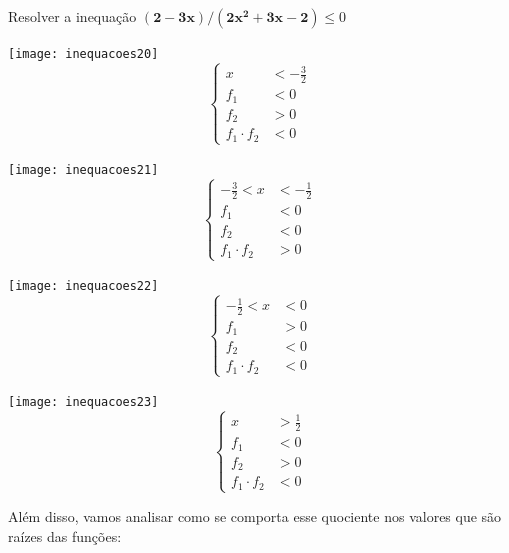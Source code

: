 \begin{example}{Resolver a inequação $\bm{(2-3x)/(2x^2+3x-2)}\leq0$}
\begin{minipage}{.195\linewidth}
\centering

\texttt{[image: inequacoes20]}
\begin{equation*}
\left \{
\begin{aligned}
x&<-\frac{3}{2}\\
f_1&<0\\
f_2&>0\\
f_1\cdot f_2&<0
\end{aligned}
\right.
\end{equation*}
\end{minipage}
\begin{minipage}{.395\linewidth}
\centering


\texttt{[image: inequacoes21]}
\begin{equation*}
\left \{
\begin{aligned}
-\frac{3}{2}<x&<-\frac{1}{2}\\
f_1&<0\\
f_2&<0\\
f_1\cdot f_2&>0
\end{aligned}
\right.
\end{equation*}
\end{minipage}
\begin{minipage}{.195\linewidth}
\centering


\texttt{[image: inequacoes22]}
\begin{equation*}
\left \{
\begin{aligned}
-\frac{1}{2}<x&<0\\
f_1&>0\\
f_2&<0\\
f_1\cdot f_2&<0
\end{aligned}
\right.
\end{equation*}
\end{minipage}
\begin{minipage}{.195\linewidth}
\centering

\texttt{[image: inequacoes23]}
\begin{equation*}
\left \{
\begin{aligned}
x&>\frac{1}{2}\\
f_1&<0\\
f_2&>0\\
f_1\cdot f_2&<0
\end{aligned}
\right.
\end{equation*}
\end{minipage}

Além disso, vamos analisar como se comporta esse quociente nos valores que são raízes das funções:


\end{example}
